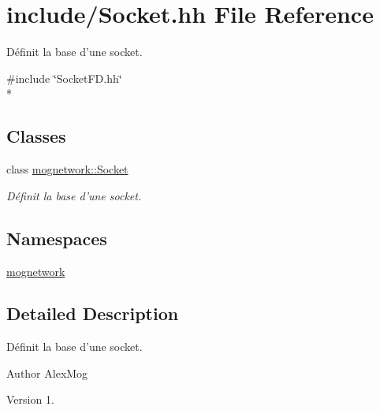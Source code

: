 \hypertarget{_socket_8hh}{\section{include/\-Socket.hh File Reference}
\label{_socket_8hh}
}


Définit la base d'une socket.  


{\ttfamily \#include \char`\"{}Socket\-F\-D.\-hh\char`\"{}}\\*
\subsection*{Classes}
\begin{DoxyCompactItemize}
\item 
class \hyperlink{classmognetwork_1_1_socket}{mognetwork\-::\-Socket}
\begin{DoxyCompactList}\small\item\em Définit la base d'une socket. \end{DoxyCompactList}\end{DoxyCompactItemize}
\subsection*{Namespaces}
\begin{DoxyCompactItemize}
\item 
\hyperlink{namespacemognetwork}{mognetwork}
\end{DoxyCompactItemize}


\subsection{Detailed Description}
Définit la base d'une socket. \begin{DoxyAuthor}{Author}
Alex\-Mog 
\end{DoxyAuthor}
\begin{DoxyVersion}{Version}
1. 
\end{DoxyVersion}
